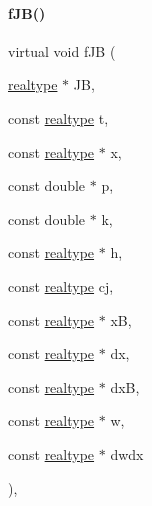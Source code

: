 \paragraph{\texorpdfstring{f\+J\+B()}{fJB()}\hspace{0.1cm}{\footnotesize\ttfamily [2/2]}}
{\footnotesize\ttfamily virtual void f\+JB (\begin{DoxyParamCaption}\item[{\mbox{\hyperlink{namespaceamici_a1bdce28051d6a53868f7ccbf5f2c14a3}{realtype}} $\ast$}]{JB,  }\item[{const \mbox{\hyperlink{namespaceamici_a1bdce28051d6a53868f7ccbf5f2c14a3}{realtype}}}]{t,  }\item[{const \mbox{\hyperlink{namespaceamici_a1bdce28051d6a53868f7ccbf5f2c14a3}{realtype}} $\ast$}]{x,  }\item[{const double $\ast$}]{p,  }\item[{const double $\ast$}]{k,  }\item[{const \mbox{\hyperlink{namespaceamici_a1bdce28051d6a53868f7ccbf5f2c14a3}{realtype}} $\ast$}]{h,  }\item[{const \mbox{\hyperlink{namespaceamici_a1bdce28051d6a53868f7ccbf5f2c14a3}{realtype}}}]{cj,  }\item[{const \mbox{\hyperlink{namespaceamici_a1bdce28051d6a53868f7ccbf5f2c14a3}{realtype}} $\ast$}]{xB,  }\item[{const \mbox{\hyperlink{namespaceamici_a1bdce28051d6a53868f7ccbf5f2c14a3}{realtype}} $\ast$}]{dx,  }\item[{const \mbox{\hyperlink{namespaceamici_a1bdce28051d6a53868f7ccbf5f2c14a3}{realtype}} $\ast$}]{dxB,  }\item[{const \mbox{\hyperlink{namespaceamici_a1bdce28051d6a53868f7ccbf5f2c14a3}{realtype}} $\ast$}]{w,  }\item[{const \mbox{\hyperlink{namespaceamici_a1bdce28051d6a53868f7ccbf5f2c14a3}{realtype}} $\ast$}]{dwdx }\end{DoxyParamCaption})\hspace{0.3cm}{\ttfamily [protected]}, {\ttfamily [virtual]}}


